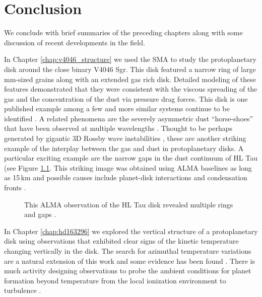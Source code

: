 \chapter{Conclusion} \label{chap:conclusion}

We conclude with brief summaries of the preceding chapters along with some discussion of recent developments 
in the field.

In Chapter \ref{chap:v4046_structure} we 
used the SMA to study the protoplanetary disk 
around the close binary V4046 Sgr.  This disk featured a narrow ring of large mm-sized grains along with
an extended gas rich disk.  Detailed modeling of these features demonstrated that they were 
consistent with the viscous spreading of the gas and the concentration of the dust via pressure 
drag forces.  This disk is one published example among a few and more similar systems continue to be
identified \citep{isella07,panic09,andrews12,degregorio-monsalvo13,ke14}.  A related phenomena are the 
severely asymmetric dust  ``horse-shoes'' that have been  observed at multiple wavelengths
\citep{vandermarel13,fukagawa13,isella13,casassus15,marino15}.  Thought to be perhaps generated by gigantic 
3D Rossby wave instabilities \citep{regaly13}, these are another striking example of the interplay between
the gas and dust in protoplanetary disks.  A particular exciting example are the narrow gaps in the dust continuum
of HL Tau (see Figure \ref{fig:hltau}. This striking image was obtained using ALMA baselines as long as 15\,km 
and possible causes include
planet-disk interactions and condensation fronts \citep{brogan14,zhang15}.

\begin{figure}
\caption{This ALMA observation of the HL Tau disk revealed multiple rings and gaps \citep{brogan15}.}
\label{fig:hltau}
\end{figure}

In Chapter \ref{chap:hd163296} we explored the vertical structure of a protoplanetary disk using 
observations that exhibited clear signs of the kinetic temperature changing vertically in the disk.
The search for azimuthal temperature variations are a natural extension of this work \citep{isella13} and 
some evidence has been found \citep{vanderplas14}.  There is much activity designing 
observations to probe the ambient conditions 
for planet formation beyond temperature from the local ionization environment \citep{cleeves14,teague15} to 
turbulence \citep{hughes11,guilloteau12,flock15,simon15}.

